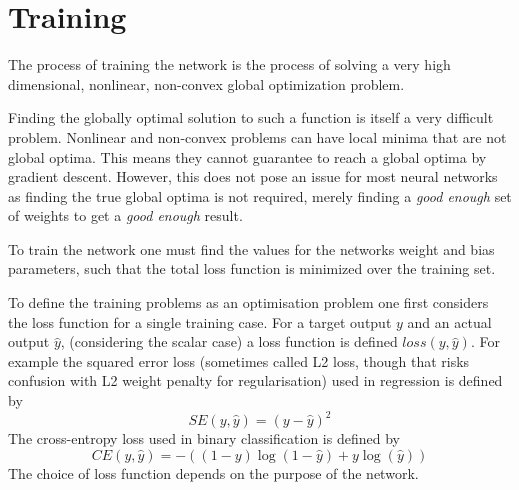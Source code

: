 \documentclass[12pt,parskip]{komatufte}
\begin{document}
\section{Training}
The process of training the network is the process of solving a very high dimensional, nonlinear, non-convex global optimization problem.


Finding the globally optimal solution to such a function is itself a very difficult problem.
Nonlinear and non-convex problems can have local minima that are not global optima.
This means they cannot guarantee to reach a global optima by gradient descent.
However, this does not pose an issue for most neural networks as finding the true global optima is not required, merely finding a \emph{good enough} set of weights to get a \emph{good enough} result.

To train the network one must find the values for the networks weight and bias parameters, such that the total loss function is minimized over the training set.

To define the training problems as an optimisation problem one first considers the loss function for a single training case.
For a target output $y$ and an actual output $\hat{y}$, (considering the scalar case) a loss function is defined $loss(y, \hat{y})$.
For example the squared error loss (sometimes called L2 loss, though that risks confusion with L2 weight penalty for regularisation) used in regression is defined by
\begin{equation}
SE(y, \hat{y})=(y-\hat{y})^2
\end{equation}
The cross-entropy loss used in binary classification is defined by
\begin{equation}
CE(y, \hat{y})=-\left((1-y)\log (1-\hat{y}) + y\log (\hat{y})\right)
\end{equation}
The choice of loss function depends on the purpose of the network.
\end{document}
